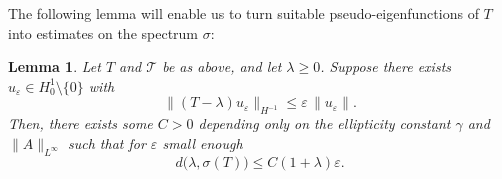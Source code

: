 \documentclass[a4paper,reqno]{amsart}
\numberwithin{equation}{section}
\numberwithin{equation}{section}		%
\numberwithin{figure}{section}			%
\numberwithin{table}{section}				%
\newtheorem{lemma}[theorem]{Lemma}
\theoremstyle{definition}
\renewcommand{\tilde}{\widetilde}
\newcommand{\<}{\ensuremath \leq}
\renewcommand{\>}{\ensuremath \geq}
\renewcommand{\epsilon}{\varepsilon}
\renewcommand{\tilde}{\widetilde}
\begin{document}
The following lemma will enable us to turn suitable pseudo-eigenfunctions of $T$ into estimates on the spectrum $\sigma$:


\begin{lemma}\label{lem: spectral_equivalence}
Let $T$ and $\mathcal T$ be as above, and let $\lambda\ge 0$. Suppose there
exists $u_\epsilon\in H^1_0\setminus\{0\}$ with
\begin{equation}
  \lVert (T-\lambda)u_\epsilon\rVert_{H^{-1}}\le\epsilon\,
  \lVert u_\epsilon\rVert.
\end{equation}
Then, there exists some $C>0$ depending only on the ellipticity constant $\gamma$ and
$\lVert A\rVert_{L^\infty}$ such that for $\epsilon$ small enough
\begin{equation}
  d\big(\lambda,\sigma(T)\big)\leq C(1+\lambda)\epsilon.
\end{equation}
\end{lemma}
\end{document}
